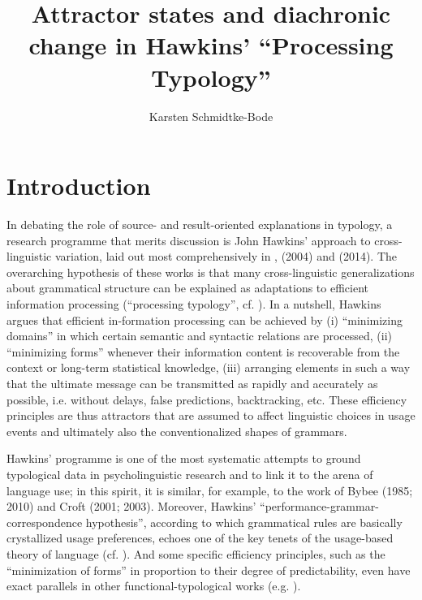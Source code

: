 \documentclass[output=paper]{langsci/langscibook}
\author{Karsten Schmidtke-Bode\affiliation{Leipzig University}}
\title{Attractor states and diachronic change in Hawkins’ “Processing Typology”}
\begin{document}
\maketitle 
 
\section{ Introduction} 

In debating the role of source- and result-oriented explanations in typology, a research programme that merits discussion is John Hawkins’ approach to cross-linguistic variation, laid out most comprehensively in \citet{Hawkins1994}, (2004) and (2014). The overarching hypothesis of these works is that many cross-linguistic generalizations about grammatical structure can be explained as adaptations to efficient information processing (“processing typology”, cf. \citealt{Hawkins2007}). In a nutshell, Hawkins argues that efficient in-formation processing can be achieved by (i) “minimizing domains” in which certain semantic and syntactic relations are processed, (ii) “minimizing forms” whenever their information content is recoverable from the context or long-term statistical knowledge, (iii) arranging elements in such a way that the ultimate message can be transmitted as rapidly and accurately as possible, i.e. without delays, false predictions, backtracking, etc. These efficiency principles are thus attractors that are assumed to affect linguistic choices in usage events and ultimately also the conventionalized shapes of grammars.

Hawkins’ programme is one of the most systematic attempts to ground typological data in psycholinguistic research and to link it to the arena of language use; in this spirit, it is similar, for example, to the work of Bybee (1985; 2010) and Croft (2001; 2003). Moreover, Hawkins’ “performance-grammar-correspondence hypothesis”, according to which grammatical rules are basically crystallized usage preferences, echoes one of the key tenets of the usage-based theory of language (cf. \citealt{Langacker1987,KemmerBarlow2000}). And some specific efficiency principles, such as the “minimization of forms” in proportion to their degree of predictability, even have exact parallels in other functional-typological works (e.g. \citealt{Haiman1983,Croft2003,Haspelmath2008_Econ}). 
\end{document}

